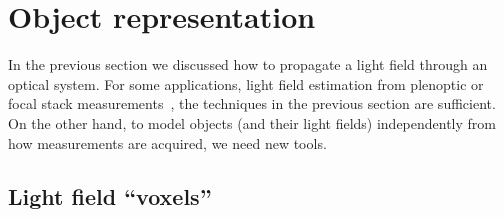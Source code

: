 \section{Object representation}

In the previous section we discussed how to propagate a light field through an 
optical system.  For some applications, \eg{} light field estimation from
plenoptic or focal stack measurements~\cite{}, the techniques in the previous
section are sufficient.  On the other hand, to model objects (and their light
fields) independently from how measurements are acquired, we need new tools.

\subsection{Light field ``voxels''}



